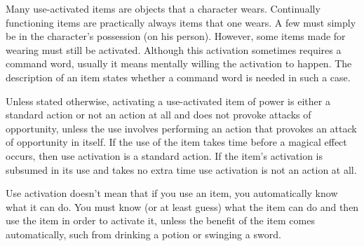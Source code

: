 Many use-activated items are objects that a character wears. Continually functioning items are practically always items that one wears. A few must simply be in the character's possession (on his person). However, some items made for wearing must still be activated. Although this activation sometimes requires a command word, usually it means mentally willing the activation to happen. The description of an item states whether a command word is needed in such a case.

Unless stated otherwise, activating a use-activated item of power is either a standard action or not an action at all and does not provoke attacks of opportunity, unless the use involves performing an action that provokes an attack of opportunity in itself. If the use of the item takes time before a magical effect occurs, then use activation is a standard action. If the item's activation is subsumed in its use and takes no extra time use activation is not an action at all.

Use activation doesn't mean that if you use an item, you automatically know what it can do. You must know (or at least guess) what the item can do and then use the item in order to activate it, unless the benefit of the item comes automatically, such from drinking a potion or swinging a sword.